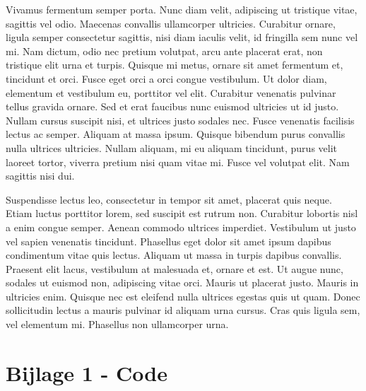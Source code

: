 \documentclass[a4paper,10pt]{article}
\begin{document}
Vivamus fermentum semper porta. Nunc diam velit, adipiscing ut tristique vitae, sagittis vel odio. Maecenas convallis ullamcorper ultricies. Curabitur ornare, ligula semper consectetur sagittis, nisi diam iaculis velit, id fringilla sem nunc vel mi. Nam dictum, odio nec pretium volutpat, arcu ante placerat erat, non tristique elit urna et turpis. Quisque mi metus, ornare sit amet fermentum et, tincidunt et orci. Fusce eget orci a orci congue vestibulum. Ut dolor diam, elementum et vestibulum eu, porttitor vel elit. Curabitur venenatis pulvinar tellus gravida ornare. Sed et erat faucibus nunc euismod ultricies ut id justo. Nullam cursus suscipit nisi, et ultrices justo sodales nec. Fusce venenatis facilisis lectus ac semper. Aliquam at massa ipsum. Quisque bibendum purus convallis nulla ultrices ultricies. Nullam aliquam, mi eu aliquam tincidunt, purus velit laoreet tortor, viverra pretium nisi quam vitae mi. Fusce vel volutpat elit. Nam sagittis nisi dui.

Suspendisse lectus leo, consectetur in tempor sit amet, placerat quis neque. Etiam luctus porttitor lorem, sed suscipit est rutrum non. Curabitur lobortis nisl a enim congue semper. Aenean commodo ultrices imperdiet. Vestibulum ut justo vel sapien venenatis tincidunt. Phasellus eget dolor sit amet ipsum dapibus condimentum vitae quis lectus. Aliquam ut massa in turpis dapibus convallis. Praesent elit lacus, vestibulum at malesuada et, ornare et est. Ut augue nunc, sodales ut euismod non, adipiscing vitae orci. Mauris ut placerat justo. Mauris in ultricies enim. Quisque nec est eleifend nulla ultrices egestas quis ut quam. Donec sollicitudin lectus a mauris pulvinar id aliquam urna cursus. Cras quis ligula sem, vel elementum mi. Phasellus non ullamcorper urna.

\newpage
\appendix
\section{Bijlage 1 - Code}
\label{sec:code}

\end{document}
